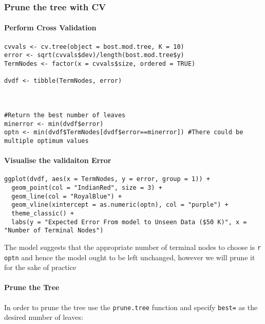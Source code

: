 \documentclass[
]{article}
\newcommand{\passthrough}[1]{#1}
\begin{document}
\hypertarget{prune-the-tree-with-cv}{%
\subsubsection{Prune the tree with CV}\label{prune-the-tree-with-cv}}

\hypertarget{perform-cross-validation}{%
\paragraph{Perform Cross Validation}\label{perform-cross-validation}}

\begin{lstlisting}
cvvals <- cv.tree(object = bost.mod.tree, K = 10)
error <- sqrt(cvvals$dev)/length(bost.mod.tree$y)
TermNodes <- factor(x = cvvals$size, ordered = TRUE)

dvdf <- tibble(TermNodes, error) 



#Return the best number of leaves
minerror <- min(dvdf$error)
optn <- min(dvdf$TermNodes[dvdf$error==minerror]) #There could be multiple optimum values
\end{lstlisting}

\hypertarget{visualise-the-validaiton-error}{%
\paragraph{Visualise the validaiton
Error}\label{visualise-the-validaiton-error}}

\begin{lstlisting}
ggplot(dvdf, aes(x = TermNodes, y = error, group = 1)) +
  geom_point(col = "IndianRed", size = 3) +
  geom_line(col = "RoyalBlue") +
  geom_vline(xintercept = as.numeric(optn), col = "purple") +
  theme_classic() +
  labs(y = "Expected Error From model to Unseen Data ($50 K)", x = "Number of Terminal Nodes")
\end{lstlisting}

The model suggests that the appropriate number of terminal nodes to
choose is \passthrough{\lstinline!r optn!} and hence the model ought to
be left unchanged, however we will prune it for the sake of practice

\hypertarget{prune-the-tree-1}{%
\paragraph{Prune the Tree}\label{prune-the-tree-1}}

In order to prune the tree use the \passthrough{\lstinline!prune.tree!}
function and specify \passthrough{\lstinline!best=!} as the desired
number of leaves:
\end{document}
